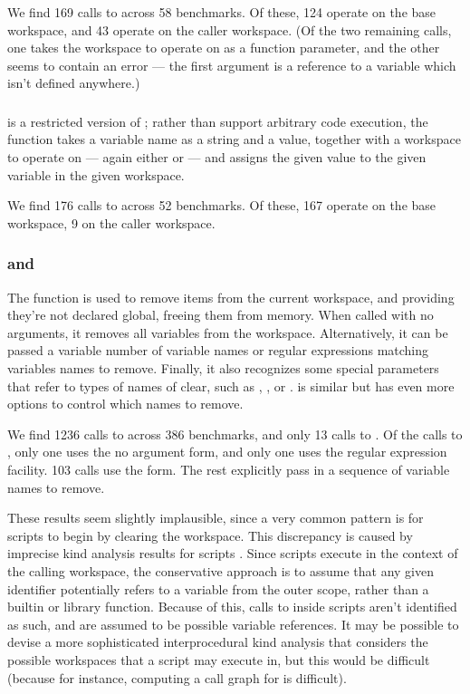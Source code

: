 We find 169 calls to  across 58 benchmarks. Of these, 124 operate
on the base workspace, and 43 operate on the caller workspace. (Of the two
remaining calls, one takes the workspace to operate on as a function parameter,
and the other seems to contain an error --- the first argument is a reference
to a variable which isn't defined anywhere.)

\subsubsection{}

 is a restricted version of ; rather than support
arbitrary code execution, the function takes a variable name as a string and a
value, together with a workspace to operate on --- again either 
or  --- and assigns the given value to the given variable in the
given workspace.

We find 176 calls to  across 52 benchmarks. Of these, 167
operate on the base workspace, 9 on the caller workspace.

\subsubsection{ and }

The  function is used to remove items from the current workspace,
and providing they're not declared global, freeing them from memory. When
called with no arguments, it removes all variables from the workspace.
Alternatively, it can be passed a variable number of variable names or regular
expressions matching variables names to remove. Finally, it also recognizes
some special parameters that refer to types of names of clear, such as
, , or .  is similar
but has even more options to control which names to remove.

We find 1236 calls to  across 386 benchmarks, and only 13 calls to
. Of the calls to , only one uses the no argument
form, and only one uses the regular expression facility. 103 calls use the
 form. The rest explicitly pass in a sequence of variable names
to remove.

These results seem slightly implausible, since a very common pattern is for
\matlab scripts to begin by clearing the workspace. This discrepancy is caused
by imprecise kind analysis results for scripts \cite{KindAnalysis}. Since
scripts execute in the context of the calling workspace, the conservative
approach is to assume that any given identifier potentially refers to a
variable from the outer scope, rather than a builtin or library function.
Because of this, calls to  inside scripts aren't identified as
such, and are assumed to be possible variable references. It may be possible to
devise a more sophisticated interprocedural kind analysis that considers the
possible workspaces that a script may execute in, but this would be difficult
(because for instance, computing a call graph for \matlab is difficult).

